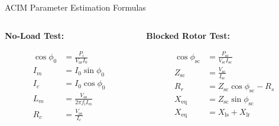 
\begin{frame}{ACIM Parameter Estimation Formulas}
	\begin{columns}[T] %

		\begin{column}{0.48\textwidth} %

			\textbf{No-Load Test:}

			\begin{align*}
				\cos \phi_0 & = \frac{P_i}{V_\text{as}I_0}             \\
				I_m         & = I_0 \sin \phi_0                        \\
				I_c         & = I_0 \cos \phi_0                        \\
				L_m         & = \frac{V_\text{as}}{2\pi f_\text{i}I_m} \\
				R_c         & = \frac{V_\text{as}}{I_c}
			\end{align*}

		\end{column}

		\begin{column}{0.48\textwidth}

			\textbf{Blocked Rotor Test:}

			\begin{align*}
				\cos \phi_\text{sc} & = \frac{P_\text{sc}}{V_\text{sc}I_\text{sc}} \\
				Z_\text{sc}         & = \frac{V_\text{sc}}{I_\text{sc}}            \\
				R_r                 & = Z_\text{sc} \cos \phi_\text{sc} - R_s      \\
				X_\text{eq}         & = Z_\text{sc} \sin \phi_\text{sc}            \\
				X_\text{eq}         & = X_\text{ls} + X_\text{lr}
			\end{align*}

		\end{column}

	\end{columns}
\end{frame}



